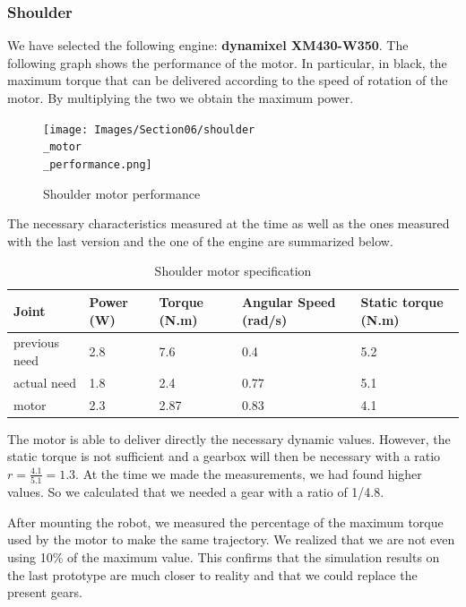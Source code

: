 \subsubsection{Shoulder}

 We have selected the following engine: \textbf{dynamixel XM430-W350}. The following graph shows the performance of the motor. In particular, in black, the maximum torque that can be delivered according to the speed of rotation of the motor. By multiplying the two we obtain the maximum power.
\begin{figure}[ht]
    \centering
    \texttt{[image: Images/Section06/shoulder\\\_motor\\\_performance.png]}
    \caption{Shoulder motor performance}
    \label{fig:ShoulderMotor}
\end{figure}
\FloatBarrier

\bigbreak
The necessary characteristics measured at the time as well as the ones measured with the last version and the one of the engine are summarized below.
\begin{table}[ht]
    \centering
    \begin{tabular}{|p{1.5cm} | p{2cm} | p{2.5cm}| p{2.7cm} | p{2.7cm} |} 
        \hline
        \textbf{Joint}& \textbf{Power (W)} & \textbf{Torque (N.m)} & \textbf{Angular Speed (rad/s)} & \textbf{Static torque (N.m)}\\ [0.3ex]
        \hline
        previous need & 2.8 & 7.6 & 0.4 & 5.2 \\ 
        \hline
        actual need & 1.8 & 2.4 & 0.77 & 5.1 \\ 
        \hline
        motor & 2.3 & 2.87 & 0.83 & 4.1\\ 
        \hline
    \end{tabular}
    \caption{Shoulder motor specification}
\end{table}
\FloatBarrier
The motor is able to deliver directly the necessary dynamic values. However, the static torque is not sufficient and a gearbox will then be necessary with a ratio $r=\frac{4.1}{5.1}=1.3$. At the time we made the measurements, we had found higher values. So we calculated that we needed a gear with a ratio of 1/4.8.

\bigbreak
After mounting the robot, we measured the percentage of the maximum torque used by the motor to make the same trajectory. We realized that we are not even using 10\% of the maximum value. This confirms that the simulation results on the last prototype are much closer to reality and that we could replace the present gears.

